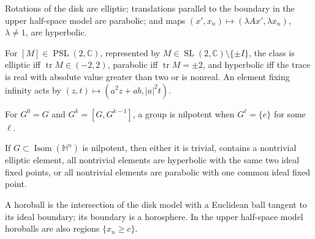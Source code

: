 \begin{example}
\label{ex:chow-iv-standard-isometry-types}
Rotations of the disk are elliptic; translations parallel to the boundary in
the upper half-space model are parabolic; and maps
\((x',x_n)\mapsto(\lambda A x',\lambda x_n)\), \(\lambda\ne1\), are hyperbolic.
\end{example}

\begin{lemma}
\label{lem:chow-iv-trace-isometry-classification}
For \([M]\in\operatorname{PSL}(2,\mathbb C)\), represented by
\(M\in\operatorname{SL}(2,\mathbb C)\setminus\{\pm I\}\), the class is
elliptic iff \(\operatorname{tr}M\in(-2,2)\), parabolic iff
\(\operatorname{tr}M=\pm2\), and hyperbolic iff the trace is real with
absolute value greater than two or is nonreal.  An element fixing infinity
acts by \((z,t)\mapsto(a^2z+ab,|a|^2t)\).
\end{lemma}

\begin{definition}
\label{def:chow-iv-nilpotent-group}
For \(G^0=G\) and \(G^k=[G,G^{k-1}]\), a group is nilpotent when
\(G^\ell=\{e\}\) for some \(\ell\).
\end{definition}

\begin{lemma}
\label{lem:chow-iv-nilpotent-isometry-subgroups}
If \(G\subset\operatorname{Isom}(\mathbb H^n)\) is nilpotent, then either it is
trivial, contains a nontrivial elliptic element, all nontrivial elements are
hyperbolic with the same two ideal fixed points, or all nontrivial elements are
parabolic with one common ideal fixed point.
\end{lemma}

\begin{definition}
\label{def:chow-iv-horoball}
A horoball is the intersection of the disk model with a Euclidean ball tangent
to its ideal boundary; its boundary is a horosphere.  In the upper half-space
model horoballs are also regions \(\{x_n\ge c\}\).
\end{definition}

